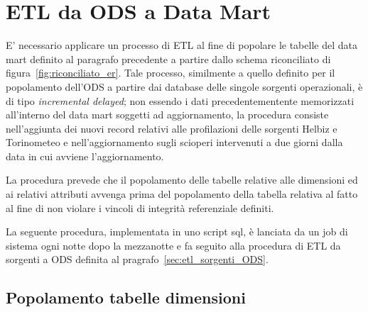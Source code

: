 \section{ETL da ODS a Data Mart}

E' necessario applicare un processo di ETL al fine di popolare le tabelle del
data mart definito al paragrafo precedente a partire dallo schema riconciliato
di figura~\ref{fig:riconciliato_er}. Tale processo, similmente a quello definito
per il popolamento dell'ODS a partire dai database delle singole sorgenti
operazionali, è di tipo \textit{incremental delayed}; non essendo i dati
precedentementente memorizzati all'interno del data mart soggetti ad aggiornamento,
la procedura consiste nell'aggiunta dei nuovi record relativi alle profilazioni
delle sorgenti Helbiz e Torinometeo e nell'aggiornamento sugli scioperi
intervenuti a due giorni dalla data in cui avviene l'aggiornamento.

La procedura prevede che il popolamento delle tabelle relative alle dimensioni
ed ai relativi attributi avvenga prima del popolamento della tabella relativa
al fatto al fine di non violare i vincoli di integrità referenziale definiti.

La seguente procedura, implementata in uno script sql, è lanciata da un job di
sistema ogni notte dopo la mezzanotte e fa seguito alla procedura di ETL
da sorgenti a ODS definita al pragrafo~\ref{sec:etl_sorgenti_ODS}.

\subsection{Popolamento tabelle dimensioni}


